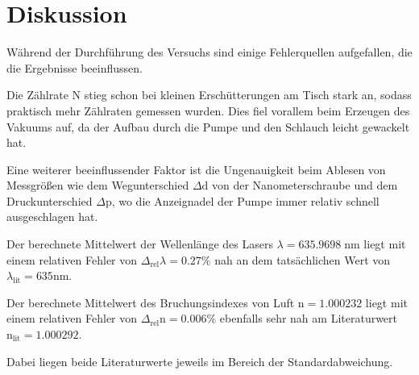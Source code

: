 \section{Diskussion}
\label{sec:Diskussion}
Während der Durchführung des Versuchs sind einige Fehlerquellen aufgefallen, die die Ergebnisse beeinflussen.

\noindent
Die Zählrate N stieg schon bei kleinen Erschütterungen am Tisch stark an, sodass praktisch mehr Zählraten gemessen wurden.
Dies fiel vorallem beim Erzeugen des Vakuums auf, da der Aufbau durch die Pumpe und den Schlauch leicht gewackelt hat.

\noindent
Eine weiterer beeinflussender Faktor ist die Ungenauigkeit beim Ablesen von Messgrößen wie dem Wegunterschied $\Delta \text{d}$ von der Nanometerschraube 
und dem Druckunterschied $\Delta \text{p}$, wo die Anzeignadel der Pumpe immer relativ schnell ausgeschlagen hat.

\noindent
Der berechnete Mittelwert der Wellenlänge des Lasers $\lambda = 635.9698 \; \si{\nano\meter}$ liegt mit einem relativen Fehler von  $\Delta_\text{rel}\lambda = 0.27\%$ nah an dem tatsächlichen Wert von $\lambda_\text{lit} = 635 \si{\nano\meter}$.


\noindent
Der berechnete Mittelwert des Bruchungsindexes von Luft $\text{n} = 1.000232$ liegt mit einem relativen Fehler von $\Delta_\text{rel} \text{n} = 0.006\%$ ebenfalls sehr nah am Literaturwert $\text{n}_\text{lit} = 1.000292$.

\noindent
Dabei liegen beide Literaturwerte jeweils im Bereich der Standardabweichung.



